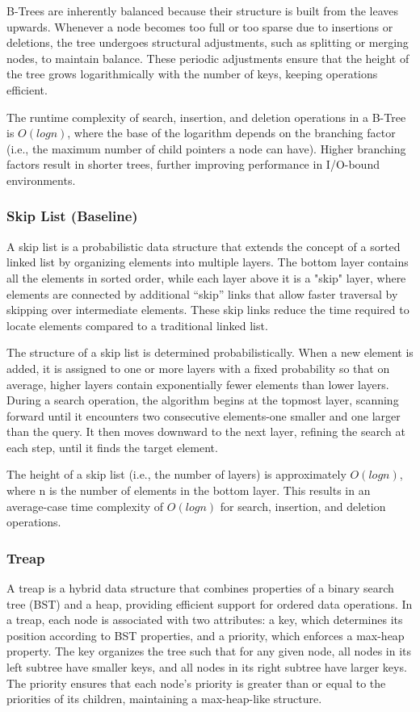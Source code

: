 \documentclass[sigconf]{acmart}
\begin{document}
B-Trees are inherently balanced because their structure is built from the leaves upwards. Whenever a node becomes too full or too sparse due to insertions or deletions, the tree undergoes structural adjustments, such as splitting or merging nodes, to maintain balance. These periodic adjustments ensure that the height of the tree grows logarithmically with the number of keys, keeping operations efficient.

The runtime complexity of search, insertion, and deletion operations in a B-Tree is $O(logn)$, where the base of the logarithm depends on the branching factor (i.e., the maximum number of child pointers a node can have). Higher branching factors result in shorter trees, further improving performance in I/O-bound environments.

\subsubsection{Skip List (Baseline) \cite{skiplist_ds}}
A skip list is a probabilistic data structure that extends the concept of a sorted linked list by organizing elements into multiple layers. The bottom layer contains all the elements in sorted order, while each layer above it is a "skip" layer, where elements are connected by additional “skip” links that allow faster traversal by skipping over intermediate elements. These skip links reduce the time required to locate elements compared to a traditional linked list.

The structure of a skip list is determined probabilistically. When a new element is added, it is assigned to one or more layers with a fixed probability so that on average, higher layers contain exponentially fewer elements than lower layers. During a search operation, the algorithm begins at the topmost layer, scanning forward until it encounters two consecutive elements-one smaller and one larger than the query. It then moves downward to the next layer, refining the search at each step, until it finds the target element.

The height of a skip list (i.e., the number of layers) is approximately $O(logn)$, where n is the number of elements in the bottom layer. This results in an average-case time complexity of $O(logn)$ for search, insertion, and deletion operations.

\subsubsection{Treap \cite{treap_ds}}
A treap is a hybrid data structure that combines properties of a binary search tree (BST) and a heap, providing efficient support for ordered data operations. In a treap, each node is associated with two attributes: a key, which determines its position according to BST properties, and a priority, which enforces a max-heap property. The key organizes the tree such that for any given node, all nodes in its left subtree have smaller keys, and all nodes in its right subtree have larger keys. The priority ensures that each node's priority is greater than or equal to the priorities of its children, maintaining a max-heap-like structure.
\end{document}
